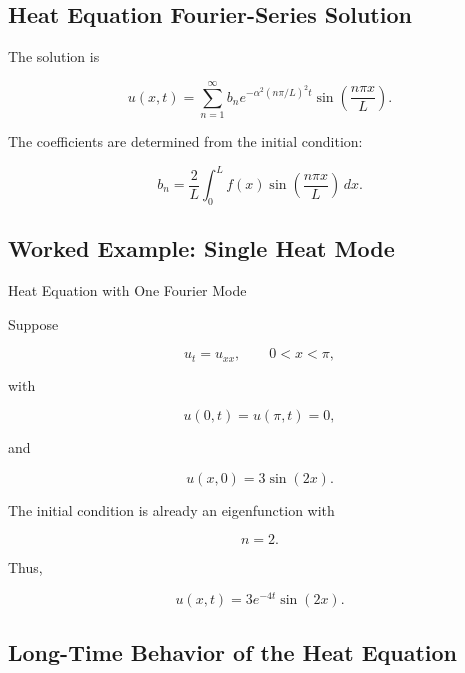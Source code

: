 \subsection{Heat Equation Fourier-Series Solution}
\label{subsec:heat-fourier-series-solution}

The solution is

\[
\boxed{
u(x,t)
=
\sum_{n=1}^{\infty}
b_n
e^{
-\alpha^2
(n\pi/L)^2
t
}
\sin
\left(
\frac{n\pi x}{L}
\right).
}
\]

The coefficients are determined from the initial condition:

\[
\boxed{
b_n
=
\frac{2}{L}
\int_0^L
f(x)
\sin
\left(
\frac{n\pi x}{L}
\right)
\,dx.
}
\]

\subsection{Worked Example: Single Heat Mode}
\label{subsec:worked-single-heat-mode}

\begin{workedexamplebox}{Heat Equation with One Fourier Mode}

Suppose

\[
u_t=u_{xx},
\qquad
0<x<\pi,
\]

with

\[
u(0,t)=u(\pi,t)=0,
\]

and

\[
u(x,0)=3\sin(2x).
\]

The initial condition is already an eigenfunction with

\[
n=2.
\]

Thus,

\begin{answerbox}
\[
\boxed{
u(x,t)
=
3e^{-4t}\sin(2x).
}
\]
\end{answerbox}

\end{workedexamplebox}

\subsection{Long-Time Behavior of the Heat Equation}
\label{subsec:heat-long-time}

